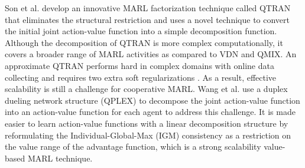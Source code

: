 \documentclass[acmsmall]{acmart}
\begin{document}
Son et al. \cite{qtran} develop an innovative MARL factorization technique called QTRAN that eliminates the structural restriction and uses a novel technique to convert the initial joint action-value function into a simple decomposition function. Although the decomposition of QTRAN is more complex computationally, it covers a broader range of MARL activities as compared to VDN and QMIX.
An approximate QTRAN performs hard in complex domains with online data collecting and requires two extra soft regularizations \cite{NEURIPS2019_f816dc0a}. As a result, effective scalability is still a challenge for cooperative MARL. 
Wang et al. \cite{qplex} use a duplex dueling network structure (QPLEX) to decompose the joint action-value function into an action-value function for each agent to address this challenge. It is made easier to learn action-value functions with a linear decomposition structure by reformulating the Individual-Global-Max (IGM) consistency as a restriction on the value range of the advantage function, which is a strong scalability value-based MARL technique.
\end{document}
